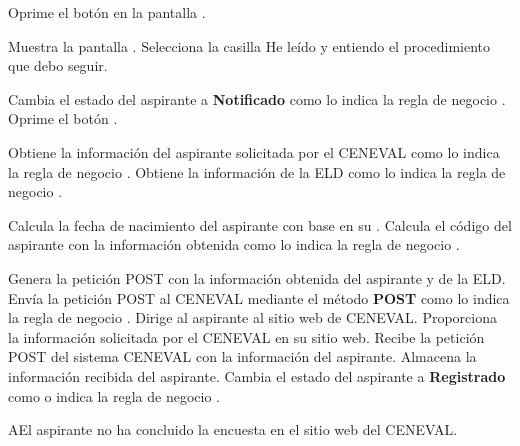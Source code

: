  \begin{UCtrayectoria}
    \UCpaso[\UCactor] Oprime el botón  en la pantalla .
    
    \UCpaso[\UCsist] Muestra la pantalla .
    \UCpaso[\UCactor] Selecciona la casilla He leído y entiendo el procedimiento que debo seguir.
   
    \UCpaso[\UCsist] Cambia el estado del aspirante a \textbf{Notificado} como lo indica la regla de negocio .
    \UCpaso[\UCactor] Oprime el botón . 
	
	\UCpaso[\UCsist] Obtiene la información del aspirante solicitada por el CENEVAL como lo indica la regla de negocio .
	\UCpaso[\UCsist] Obtiene la información de la ELD como lo indica la regla de negocio .
	
    \UCpaso[\UCsist] Calcula la fecha de nacimiento del aspirante con base en su .
    \UCpaso[\UCsist] Calcula el código del aspirante con la información obtenida como lo indica la regla de negocio .
    
    \UCpaso[\UCsist] Genera la petición POST con la información obtenida del aspirante y de la ELD.
    \UCpaso[\UCsist] Envía la petición POST al CENEVAL mediante el método \textbf{POST} como lo indica la regla de negocio .
    \UCpaso[\UCsist] Dirige al aspirante al sitio web de CENEVAL.
    \UCpaso[\UCactor] Proporciona la información solicitada por el CENEVAL en su sitio web.
    \UCpaso[\UCsist] Recibe la petición POST del sistema CENEVAL con la información del aspirante.  
    \UCpaso[\UCsist] Almacena la información recibida del aspirante.
    \UCpaso[\UCsist] Cambia el estado del aspirante a \textbf{Registrado} como o indica la regla de negocio .
    
    

\end{UCtrayectoria}




\begin{UCtrayectoriaA}{A}{El aspirante no ha concluido la encuesta en el sitio web del CENEVAL.}

\end{UCtrayectoriaA}


